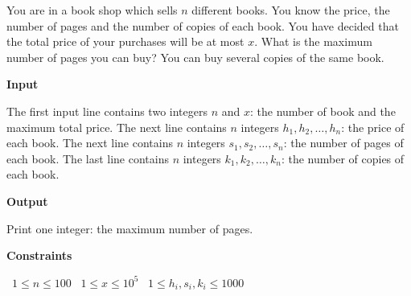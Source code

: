 You are in a book shop which sells $n$ different books. You know the price, the number of pages and the number of copies of each book.
You have decided that the total price of your purchases will be at most $x$. What is the maximum number of pages you can buy? You can buy several copies of the same book.

\vspace{0.3cm}\noindent\textbf{Input}

The first input line contains two integers $n$ and $x$: the number of book and the maximum total price.
The next line contains $n$ integers $h_1,h_2,\ldots,h_n$: the price of each book.
The next line contains $n$ integers $s_1,s_2,\ldots,s_n$: the number of pages of each book.
The last line contains $n$ integers $k_1,k_2,\ldots,k_n$: the number of copies of each book.

\vspace{0.3cm}\noindent\textbf{Output}

Print one integer: the maximum number of pages.

\vspace{0.3cm}\noindent\textbf{Constraints}

\textbullet\ $1 \le n \le 100$
\textbullet\ $1 \le x \le 10^5$
\textbullet\ $1 \le h_i, s_i, k_i \le 1000$